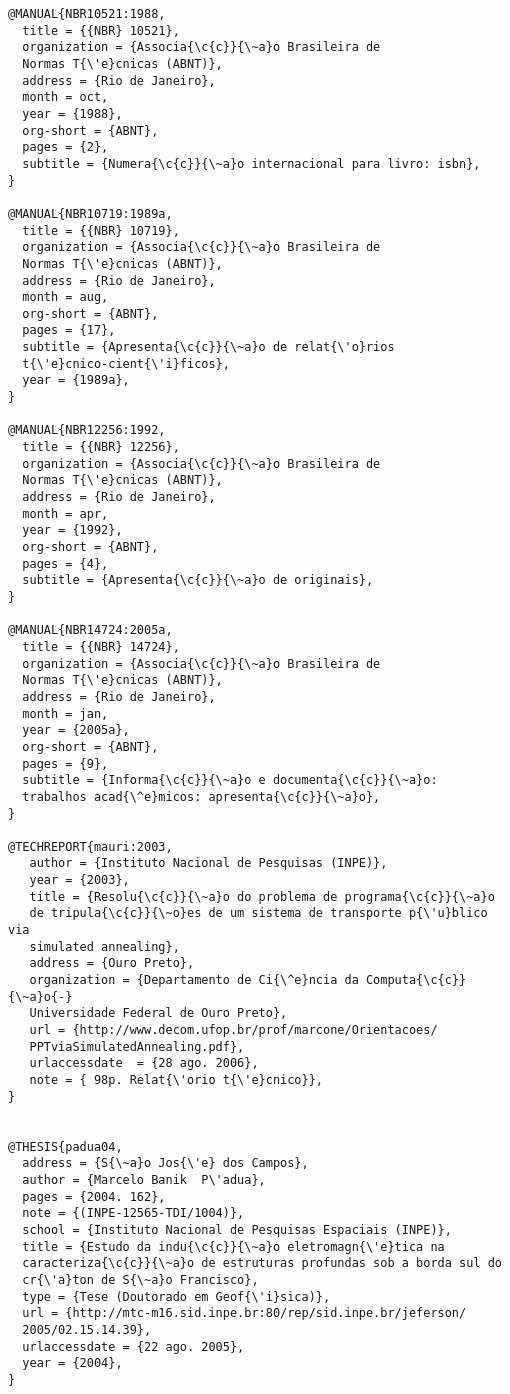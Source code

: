 \begin{verbatim}
@MANUAL{NBR10521:1988,
  title = {{NBR} 10521},
  organization = {Associa{\c{c}}{\~a}o Brasileira de 
  Normas T{\'e}cnicas (ABNT)},
  address = {Rio de Janeiro},
  month = oct,
  year = {1988},
  org-short = {ABNT},
  pages = {2},
  subtitle = {Numera{\c{c}}{\~a}o internacional para livro: isbn},
}

@MANUAL{NBR10719:1989a,
  title = {{NBR} 10719},
  organization = {Associa{\c{c}}{\~a}o Brasileira de 
  Normas T{\'e}cnicas (ABNT)},
  address = {Rio de Janeiro},
  month = aug,
  org-short = {ABNT},
  pages = {17},
  subtitle = {Apresenta{\c{c}}{\~a}o de relat{\'o}rios  
  t{\'e}cnico-cient{\'i}ficos},
  year = {1989a},
}

@MANUAL{NBR12256:1992,
  title = {{NBR} 12256},
  organization = {Associa{\c{c}}{\~a}o Brasileira de 
  Normas T{\'e}cnicas (ABNT)},
  address = {Rio de Janeiro},
  month = apr,
  year = {1992},
  org-short = {ABNT},
  pages = {4},
  subtitle = {Apresenta{\c{c}}{\~a}o de originais},
}

@MANUAL{NBR14724:2005a,
  title = {{NBR} 14724},
  organization = {Associa{\c{c}}{\~a}o Brasileira de 
  Normas T{\'e}cnicas (ABNT)},
  address = {Rio de Janeiro},
  month = jan,
  year = {2005a},
  org-short = {ABNT},
  pages = {9},
  subtitle = {Informa{\c{c}}{\~a}o e documenta{\c{c}}{\~a}o: 
  trabalhos acad{\^e}micos: apresenta{\c{c}}{\~a}o},
}

@TECHREPORT{mauri:2003,
   author = {Instituto Nacional de Pesquisas (INPE)}, 
   year = {2003},
   title = {Resolu{\c{c}}{\~a}o do problema de programa{\c{c}}{\~a}o 
   de tripula{\c{c}}{\~o}es de um sistema de transporte p{\'u}blico via 
   simulated annealing},
   address = {Ouro Preto},
   organization = {Departamento de Ci{\^e}ncia da Computa{\c{c}}{\~a}o{-} 
   Universidade Federal de Ouro Preto},
   url = {http://www.decom.ufop.br/prof/marcone/Orientacoes/
   PPTviaSimulatedAnnealing.pdf},
   urlaccessdate  = {28 ago. 2006},   
   note = { 98p. Relat{\'orio t{\'e}cnico}},
}


@THESIS{padua04,
  address = {S{\~a}o Jos{\'e} dos Campos},
  author = {Marcelo Banik  P\'adua},
  pages = {2004. 162},
  note = {(INPE-12565-TDI/1004)},
  school = {Instituto Nacional de Pesquisas Espaciais (INPE)},
  title = {Estudo da indu{\c{c}}{\~a}o eletromagn{\'e}tica na 
  caracteriza{\c{c}}{\~a}o de estruturas profundas sob a borda sul do
  cr{\'a}ton de S{\~a}o Francisco},
  type = {Tese (Doutorado em Geof{\'i}sica)},
  url = {http://mtc-m16.sid.inpe.br:80/rep/sid.inpe.br/jeferson/
  2005/02.15.14.39},
  urlaccessdate = {22 ago. 2005}, 
  year = {2004},
}


\end{verbatim}
